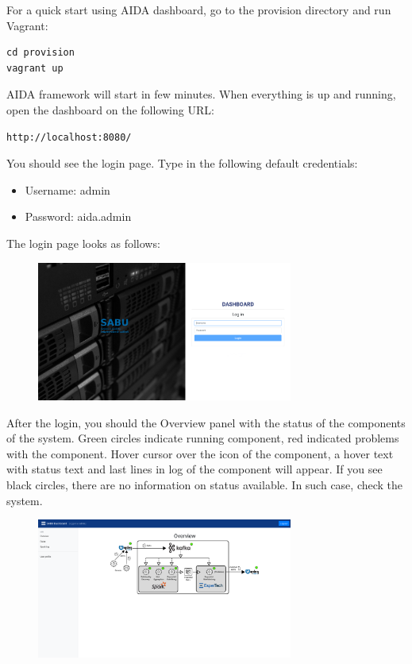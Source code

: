 \documentclass[a4paper]{article} %
\begin{document}
For a quick start using AIDA dashboard, go to the provision directory and run Vagrant:

\begin{lstlisting}[]
cd provision
vagrant up
\end{lstlisting}

AIDA framework will start in few minutes. When everything is up and running, open the dashboard on the following URL:

\begin{lstlisting}[]
http://localhost:8080/
\end{lstlisting}

You should see the login page. Type in the following default credentials:
\begin{itemize}[noitemsep,nolistsep]
  \item[] Username: admin
  \item[] Password: aida.admin
\end{itemize}
The login page looks as follows:

\begin{figure}[h]
  \centering
  \includegraphics[width=0.75\textwidth]{fig/dashboard_login}
\end{figure}

After the login, you should the Overview panel with the status of the components of the system. Green circles indicate running component, red indicated problems with the component. Hover cursor over the icon of the component, a hover text with status text and last lines in log of the component will appear. If you see black circles, there are no information on status available. In such case, check the system.

\begin{figure}[h]
  \centering
  \includegraphics[width=0.75\textwidth]{fig/dashboard_overview}
\end{figure}
\end{document}

